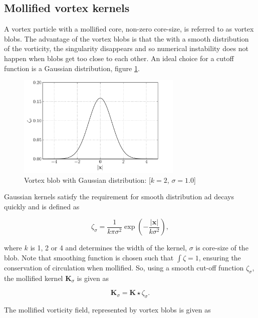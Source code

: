 \subsection{Mollified vortex kernels}

A vortex particle with a mollified core, non-zero core-size, is referred to as vortex blobs. The advantage of the vortex blobs is that the with a smooth distribution of the vorticity, the singularity disappears and so numerical instability does not happen when blobs get too close to each other. An ideal choice for a cutoff function is a Gaussian distribution, figure \ref{fig:gaussianDistribution}.

	\begin{figure}[t]
	\centering
	\includegraphics[width=0.7\textwidth]{figures/lagrangian/gaussianKernel.pdf}
	\caption{Vortex blob with Gaussian distribution: [$k=2$, $\sigma=1.0$]}
	\label{fig:gaussianDistribution}
	\end{figure}

Gaussian kernels satisfy the requirement for smooth distribution ad decays quickly and is defined as
	
	\begin{equation}
	\zeta_{\sigma} = \frac{1}{k\pi\sigma^2}\exp\left(-\frac{\left|\mathbf{x}\right|}{k\sigma^2}\right),
	\end{equation}

where $k$ is 1, 2 or 4 and determines the width of the kernel, $\sigma$ is core-size of the blob. Note that smoothing function is chosen such that $\int \zeta = 1$, ensuring the conservation of circulation when mollified. So, using a smooth cut-off function $\zeta_{\sigma}$, the mollified kernel $\mathbf{K}_{\sigma}$ is given as 

	\begin{equation}
	\mathbf{K}_{\sigma} = \mathbf{K} \star \zeta_{\sigma}.
	\end{equation}

The mollified vorticity field, represented by vortex blobs is given as

